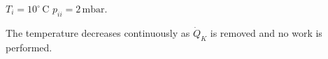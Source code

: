 \( T_i = 10^\circ \, \text{C} \)  
\( p_{ii} = 2 \, \text{mbar} \).  

The temperature decreases continuously as \( \dot{Q}_K \) is removed and no work is performed.